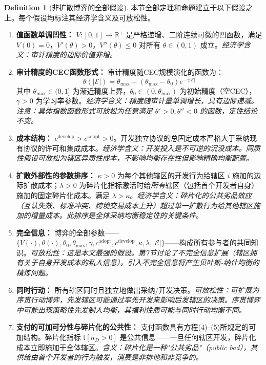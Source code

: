 \documentclass[12pt,a4paper]{ctexart}
\theoremstyle{definition}
\newtheorem{definition}{Definition}[section]
\theoremstyle{remark}
\begin{document}
\begin{definition}[非扩散博弈的全部假设]
\label{def:assumptions-npe}
本节全部定理和命题建立于以下假设之上。每个假设均标注其经济学含义及可放松性。

\begin{enumerate}[label=\textbf{A\arabic*}, leftmargin=*, itemsep=4pt]
\item \textbf{值函数单调凹性：} $V: [0,1] \to \mathbb{R}^+$ 是严格递增、二阶连续可微的凹函数，满足 $V(0) = 0$，$V'(\theta) > 0$，$V''(\theta) \leq 0$ 对所有 $\theta \in (0,1)$ 成立。\hfill\textit{经济学含义：审计精度的边际价值非增。}

\item \textbf{审计精度的CEC函数形式：} 审计精度随CEC规模演化的函数为：
\begin{equation}
\theta(|\mathcal{E}|) = \theta_{\max} - (\theta_{\max} - \theta_0) e^{-\gamma |\mathcal{E}|}
\end{equation}
其中 $\theta_{\max} \in (0,1]$ 为渐近精度上界，$\theta_0 \in (0, \theta_{\max})$ 为初始精度（空CEC），$\gamma > 0$ 为学习率参数。\hfill\textit{经济学含义：精度随审计量单调增长，具有边际递减。注意：具体指数函数形式可放松为任意满足 $\theta' > 0, \theta'' < 0$ 的函数，定性结论不变。}

\item \textbf{成本结构：} $c^{\text{develop}} > c^{\text{adopt}} > 0$。开发独立协议的总固定成本严格大于采纳现有协议的许可和集成成本。\hfill\textit{经济学含义：开发投入是不可逆的沉没成本。同质性假设可放松为辖区异质性成本，不影响均衡存在性但影响精确均衡配置。}

\item \textbf{扩散外部性的参数排序：} $\kappa > 0$ 为每个其他辖区的开发行为给辖区 $i$ 施加的边际扩散成本；$\lambda > 0$ 为碎片化指标激活时给\textit{所有}辖区（包括首个开发者自身）施加的固定碎片化成本。满足 $\lambda > \kappa$。\hfill\textit{经济学含义：碎片化的公共劣品效应（互认失效、标准冲突、跨境交易成本上升）超过单一扩散行为给其他辖区施加的增量成本。此排序是全体采纳均衡稳定性的关键条件。}

\item \textbf{完全信息：} 博弈的全部参数——$\{V(\cdot), \theta(\cdot), \theta_0, \theta_{\max}, \gamma, c^{\text{adopt}}, c^{\text{develop}}, \kappa, \lambda, |\mathcal{E}|\}$——构成所有参与者的共同知识。\hfill\textit{可放松性：这是本文最强的假设。第7节讨论了不完全信息扩展（辖区拥有关于自身开发成本的私人信息）。引入不完全信息将产生贝叶斯-纳什均衡的精炼问题。}

\item \textbf{同时行动：} 所有辖区同时且独立地做出采纳/开发决策。\hfill\textit{可放松性：可扩展为序贯行动博弈，先发辖区可能通过率先开发来影响后发辖区的决策。序贯博弈中可能出现策略性先发制人均衡，其福利性质可能与同时行动均衡不同。}

\item \textbf{支付的可加可分性与碎片化的公共性：} 支付函数具有方程(4)--(5)所规定的可加结构。碎片化指标 $\mathbb{I}[n_D > 0]$ 是公共信息——一旦任何辖区开发，碎片化成本立即施加于全体辖区。\hfill\textit{含义：碎片化是一种"公共劣品"（public bad），其供给由首个开发者的行为触发，消费是非排他和非竞争的。}
\end{enumerate}
\end{definition}
\end{document}
